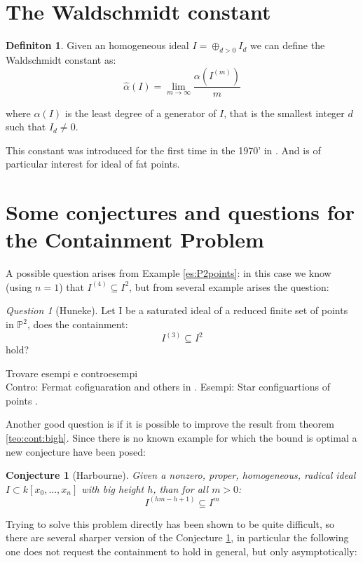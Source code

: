 \documentclass[]{book}
\theoremstyle{plain}
\newtheorem{conj}[teo]{Conjecture}
\theoremstyle{remark}
\newtheorem{que}[rem]{Question}
\theoremstyle{definition}
\newtheorem{deff}[teo]{Definiton}
\newcommand{\PP}{\mathbb{P}}
\newcommand{\cont}[2]{ I^{(#1)} \subseteq I^{#2}}
\begin{document}
	
\section{The Waldschmidt constant}

\begin{deff}\label{def:walds}
Given an homogeneous ideal $ I = \oplus_{d>0} I_d$ we can define the Waldschmidt constant as:
\[
\hat{\alpha}(I) = \lim_{m \to \infty} \frac{\alpha (I^{(m)})   }{m}
\]

where $ \alpha(I) $ is the least degree of a generator of $ I $, that is the smallest integer $ d $ such that $ I_d \neq 0 $.
\end{deff}

This constant was introduced for the first time in the 1970' in \cite{Wald77}. And is of particular interest for ideal of fat points. 

\section{Some conjectures and questions for the Containment Problem}
	A possible question arises from Example \ref{es:P2points}: in this case we know (using $ n=1 $) that $  \cont{4}{2}$, but from several example arises the question:
	\begin{que}[Huneke] \label{que:32}
	Let I be a saturated ideal of a reduced finite set of points in $ \PP^2 $, does the containment:
	\[ \cont{3}{2} \]
	hold?
	\end{que}
	
	\begin{tcolorbox}
	Trovare esempi e controesempi\\
	Contro: Fermat cofiguaration and others in \cite{DSTG13}. 
	Esempi: Star configuartions of points \cite{Har11}.
	\end{tcolorbox}
	
	Another good question is if it is possible to improve the result from theorem \ref{teo:cont:bigh}. Since there is no known example for which the bound is optimal a new conjecture have been posed:
	
	\begin{conj}[Harbourne]\label{conj:harb}
		Given a nonzero, proper, homogeneous, radical ideal $ I \subset k[x_0 , ... , x_n] $ with big height $ h $, than for all $ m > 0 $:
		\[
		\cont{hm - h +1}{m}
		\]
	\end{conj}
	
	Trying to solve this problem directly has been shown to be quite difficult, so there are several  sharper version of the Conjecture \ref{conj:harb}, in particular the following one does not request the containment to hold in general, but only asymptotically:
	
\end{document}
